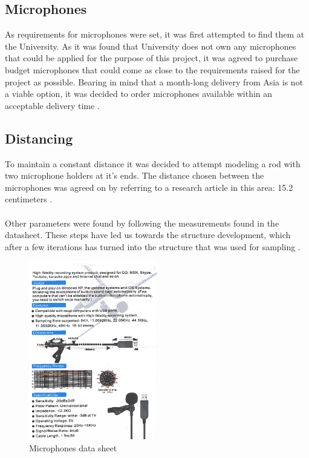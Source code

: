 \subsection{Microphones}
As requirements for microphones were set, it was first attempted to find them at the University. As it was found that University does not own any microphones that could be applied for the purpose of this project, it was agreed to purchase budget microphones that could come as close to the requirements raised for the project as possible. Bearing in mind that a month-long delivery from Asia is not a viable option, it was decided to order microphones available within an acceptable delivery time .\\

\subsection{Distancing}
To maintain a constant distance it was decided to attempt modeling a rod with two microphone holders at it's ends. The distance chosen between the microphones was agreed on by referring to a research article in this area: 15.2 centimeters . 
\paragraph{}
Other parameters were found by following the measurements found in the datasheet. These steps have led us towards the structure development, which after a few iterations has turned into the structure that was used for sampling .
\begin{figure} [htp] 
  \centering
    \includegraphics[width=0.5\textwidth]{Illustrations/MicData}
    \caption{Microphones data sheet}
    \label{fig:MicData}
\end{figure}

